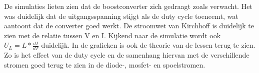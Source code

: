 De simulaties lieten zien dat de boostconverter zich gedraagt zoals verwacht. Het was duidelijk dat de uitgangsspanning stijgt als de duty cycle toeneemt, wat aantoont dat de converter goed werkt. De stroomwet van Kirchhoff is duidelijk te zien met de relatie tussen V en I. Kijkend naar de simulatie wordt ook \(U_L = L * \frac{dI}{dT}\) duidelijk. In de grafieken is ook de theorie van de lessen terug te zien. Zo is het effect van de duty cycle en de samenhang hiervan met de verschillende stromen goed terug te zien in de diode-, mosfet- en spoelstromen.